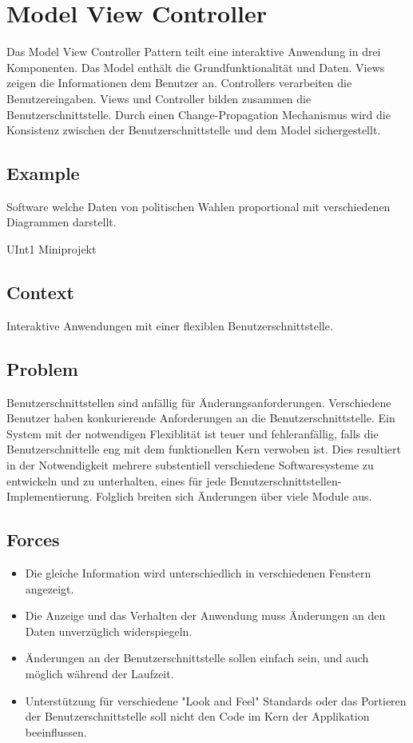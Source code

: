 \section{Model View Controller}


Das Model View Controller Pattern teilt eine interaktive Anwendung in drei Komponenten. Das Model enthält die Grundfunktionalität und Daten. Views zeigen die Informationen dem Benutzer an. Controllers verarbeiten die Benutzereingaben. Views und Controller bilden zusammen die Benutzerschnittstelle. Durch einen Change-Propagation Mechanismus wird die Konsistenz zwischen der Benutzerschnittstelle und dem Model sichergestellt.

\subsection*{Example}


Software welche Daten von politischen Wahlen proportional mit verschiedenen Diagrammen darstellt.

UInt1 Miniprojekt

\subsection*{Context}


Interaktive Anwendungen mit einer flexiblen Benutzerschnittstelle.

\subsection*{Problem}


Benutzerschnittstellen sind anfällig für Änderungsanforderungen. Verschiedene Benutzer haben konkurierende Anforderungen an die Benutzerschnittstelle. Ein System mit der notwendigen Flexiblität ist teuer und fehleranfällig, falls die Benutzerschnittelle eng mit dem funktionellen Kern verwoben ist. Dies resultiert in der Notwendigkeit mehrere substentiell verschiedene Softwaresysteme zu entwickeln und zu unterhalten, eines für jede Benutzerschnittstellen-Implementierung. Folglich breiten sich Änderungen über viele Module aus.

\subsection*{Forces}


\begin{itemize}
	\item Die gleiche Information wird unterschiedlich in verschiedenen Fenstern angezeigt.
	\item Die Anzeige und das Verhalten der Anwendung muss Änderungen an den Daten unverzüglich widerspiegeln.
	\item Änderungen an der Benutzerschnittstelle sollen einfach sein, und auch möglich während der Laufzeit.
	\item Unterstützung für verschiedene "Look and Feel" Standards oder das Portieren der Benutzerschnittstelle soll nicht den Code im Kern der Applikation beeinflussen.
\end{itemize}

